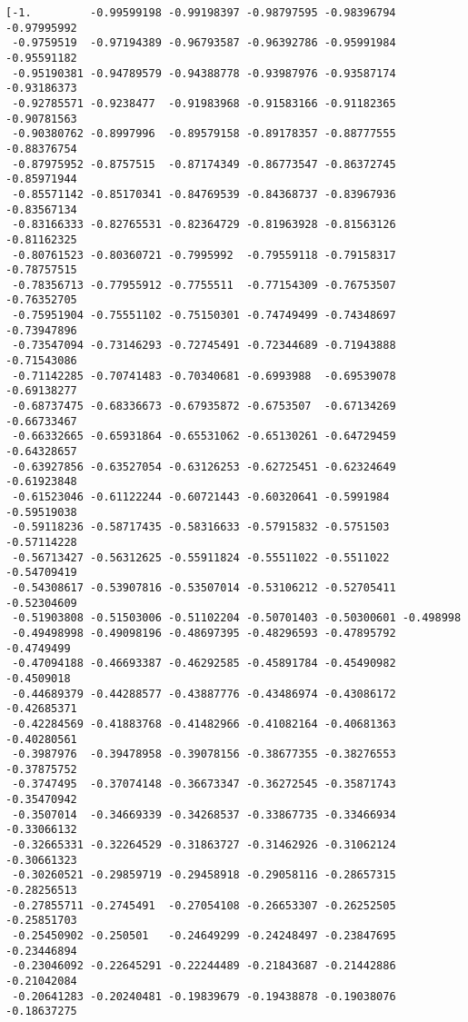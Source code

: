 \documentclass[11pt]{article}
\begin{document}
    \begin{Verbatim}[commandchars=\\\{\}]
[-1.         -0.99599198 -0.99198397 -0.98797595 -0.98396794 -0.97995992
 -0.9759519  -0.97194389 -0.96793587 -0.96392786 -0.95991984 -0.95591182
 -0.95190381 -0.94789579 -0.94388778 -0.93987976 -0.93587174 -0.93186373
 -0.92785571 -0.9238477  -0.91983968 -0.91583166 -0.91182365 -0.90781563
 -0.90380762 -0.8997996  -0.89579158 -0.89178357 -0.88777555 -0.88376754
 -0.87975952 -0.8757515  -0.87174349 -0.86773547 -0.86372745 -0.85971944
 -0.85571142 -0.85170341 -0.84769539 -0.84368737 -0.83967936 -0.83567134
 -0.83166333 -0.82765531 -0.82364729 -0.81963928 -0.81563126 -0.81162325
 -0.80761523 -0.80360721 -0.7995992  -0.79559118 -0.79158317 -0.78757515
 -0.78356713 -0.77955912 -0.7755511  -0.77154309 -0.76753507 -0.76352705
 -0.75951904 -0.75551102 -0.75150301 -0.74749499 -0.74348697 -0.73947896
 -0.73547094 -0.73146293 -0.72745491 -0.72344689 -0.71943888 -0.71543086
 -0.71142285 -0.70741483 -0.70340681 -0.6993988  -0.69539078 -0.69138277
 -0.68737475 -0.68336673 -0.67935872 -0.6753507  -0.67134269 -0.66733467
 -0.66332665 -0.65931864 -0.65531062 -0.65130261 -0.64729459 -0.64328657
 -0.63927856 -0.63527054 -0.63126253 -0.62725451 -0.62324649 -0.61923848
 -0.61523046 -0.61122244 -0.60721443 -0.60320641 -0.5991984  -0.59519038
 -0.59118236 -0.58717435 -0.58316633 -0.57915832 -0.5751503  -0.57114228
 -0.56713427 -0.56312625 -0.55911824 -0.55511022 -0.5511022  -0.54709419
 -0.54308617 -0.53907816 -0.53507014 -0.53106212 -0.52705411 -0.52304609
 -0.51903808 -0.51503006 -0.51102204 -0.50701403 -0.50300601 -0.498998
 -0.49498998 -0.49098196 -0.48697395 -0.48296593 -0.47895792 -0.4749499
 -0.47094188 -0.46693387 -0.46292585 -0.45891784 -0.45490982 -0.4509018
 -0.44689379 -0.44288577 -0.43887776 -0.43486974 -0.43086172 -0.42685371
 -0.42284569 -0.41883768 -0.41482966 -0.41082164 -0.40681363 -0.40280561
 -0.3987976  -0.39478958 -0.39078156 -0.38677355 -0.38276553 -0.37875752
 -0.3747495  -0.37074148 -0.36673347 -0.36272545 -0.35871743 -0.35470942
 -0.3507014  -0.34669339 -0.34268537 -0.33867735 -0.33466934 -0.33066132
 -0.32665331 -0.32264529 -0.31863727 -0.31462926 -0.31062124 -0.30661323
 -0.30260521 -0.29859719 -0.29458918 -0.29058116 -0.28657315 -0.28256513
 -0.27855711 -0.2745491  -0.27054108 -0.26653307 -0.26252505 -0.25851703
 -0.25450902 -0.250501   -0.24649299 -0.24248497 -0.23847695 -0.23446894
 -0.23046092 -0.22645291 -0.22244489 -0.21843687 -0.21442886 -0.21042084
 -0.20641283 -0.20240481 -0.19839679 -0.19438878 -0.19038076 -0.18637275

\end{Verbatim}
\end{document}
